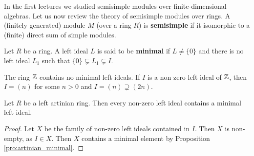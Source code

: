
In the first lectures we studied semisimple modules over finite-dimensional 
algebras. Let us now review the theory of semisimple modules over rings. 
A (finitely generated) module $M$ (over a ring $R$) is \textbf{semisimple} 
if it isomorphic to a (finite) direct sum of simple modules. 

\begin{definition}
    Let $R$ be a ring. A left ideal $L$ is said to be \textbf{minimal}
    if $L\ne\{0\}$ and there is no left ideal $L_1$
    such that $\{0\}\subsetneq L_1\subsetneq I$.
\end{definition}

The ring $\mathbb{Z}$ contains no minimal left ideals. If $I$ is a non-zero 
left ideal of $\mathbb{Z}$, then
$I=(n)$ for some $n>0$ and $I=(n)\supsetneq (2n)$. 

\begin{proposition}
    Let $R$ be a left artinian ring. 
    Then every non-zero left ideal contains a minimal left ideal. 
\end{proposition}

\begin{proof}
    Let $X$ be the family of non-zero left ideals contained in $I$. Then $X$ is non-empty, as 
    $I\in X$. Then $X$ contains a minimal element by Proposition \ref{pro:artinian_minimal}. 
\end{proof}



